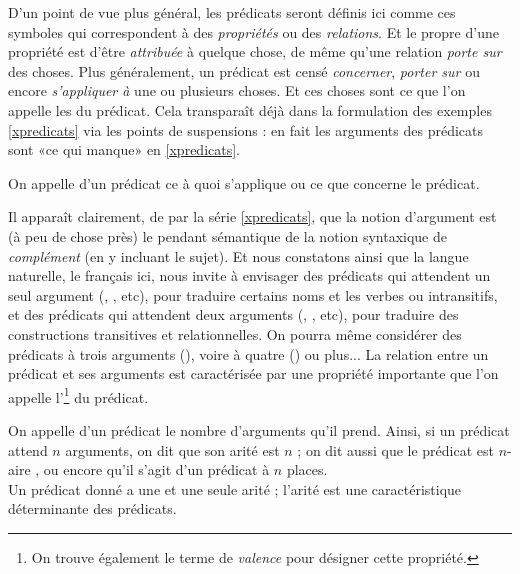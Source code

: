 D'un point de vue plus général, les
prédicats seront définis ici comme ces symboles qui correspondent à des
\emph{propriétés} ou des \emph{relations}.  Et le propre d'une
propriété est d'être \emph{attribuée} à quelque chose, de même qu'une
relation \emph{porte sur} des choses.  Plus généralement, un prédicat
est censé  \emph{concerner},  \emph{porter sur} ou encore
\emph{s'appliquer à} une ou plusieurs choses.  Et 
ces choses sont ce que l'on appelle les  du prédicat.
Cela transparaît déjà dans la formulation des exemples
\ref{xpredicats} via les points de suspensions : en fait les
arguments des prédicats sont «ce qui manque» en
\ref{xpredicats}.

\begin{defi}[Argument]
On appelle  d'un prédicat ce à quoi s'applique ou ce que
concerne le prédicat.
\end{defi}

Il apparaît clairement, 
de par la série \ref{xpredicats}, que la notion d'argument est (à
peu de chose près) le pendant sémantique de la notion syntaxique de
\emph{complément} (en y incluant le sujet).
Et
nous constatons ainsi que la langue
naturelle, le français ici, nous invite à envisager des prédicats qui
attendent un seul argument (, , etc), pour
traduire certains noms et les verbes ou {\GV} intransitifs, et des
prédicats qui  attendent deux arguments (, , etc), pour traduire des constructions transitives et relationnelles.  On pourra
même considérer des prédicats à trois 
arguments (), voire à quatre
() ou plus...
La relation entre un prédicat et ses arguments est caractérisée par une propriété importante que l'on appelle l'\footnote{On trouve également le terme de \emph{valence} pour désigner cette propriété.} du prédicat.
\addtocounter{footnote}{1}
\addtocounter{footnote}{-1}

\begin{defi}[Arité]\label{arite}
On appelle  d'un prédicat le nombre d'arguments qu'il
prend.  Ainsi, si un prédicat attend $n$ arguments, on dit que son
arité est $n$ ; on dit aussi que le prédicat est $n$-aire%
\footnotemark, ou encore
qu'il s'agit d'un prédicat à $n$ places.
\\
Un prédicat donné a une et une seule arité ; l'arité est une
caractéristique déterminante des prédicats.
\end{defi}

